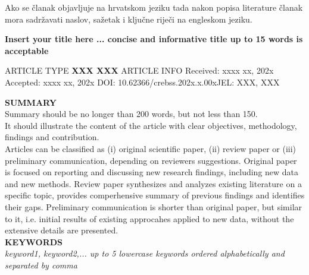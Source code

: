 \documentclass[
  letterpaper,
  DIV=11,
  numbers=noendperiod]{scrartcl}
\renewcommand\doinumber{10.62366/crebss.202x.x.00x}
\renewcommand\JEL{XXX, XXX}
\begin{document}
	\bigskip
	\bigskip
	
\noindent Ako se članak objavljuje na hrvatskom jeziku tada nakon popisa literature članak mora sadržavati naslov, sažetak i ključne riječi na engleskom jeziku.

\begin{center}
	\large  \bf Insert your title here ... {\color{red}concise and informative title up to 15 words is acceptable}
\end{center}

\begin{minipage}[b]{\dimexpr0.32\textwidth-1\fboxrule-0.5\fboxsep\relax}
	ARTICLE TYPE \newline
	\rm\small \textbf{XXX XXX} \newline \newline \newline
	ARTICLE INFO \newline
	Received: xxxx xx, 202x \newline Accepted: xxxx xx, 202x \newline DOI: \doinumber \newline JEL: \JEL  \newline \newline \newline
\end{minipage}%
\begin{minipage}[b]{0.68\textwidth}
	\vspace{0.2cm}  \textbf{SUMMARY} \\
		{\color{red} Summary should be no longer than 200 words, but not less than 150. \\ It should illustrate the content of the article with clear objectives, methodology, findings and contribution. \\ Articles can be classified as (i) original scientific paper, (ii) review paper or (iii) preliminary communication, depending on reviewers suggestions.} Original paper is focused on reporting and discussing new research findings, including new data and new methods. Review paper synthesizes and analyzes existing literature on a specific topic, provides comperhensive summary of previous findings and identifies their gaps. Preliminary communication is shorter than original paper, but similar to it, i.e. initial results of existing approcahes applied to new data, without the extensive details are presented. \smallskip \\
	\textbf{KEYWORDS} \\ {\it keyword1, keyword2,... {\color{red}up to 5 lowercase keywords ordered alphabetically and separated by comma}}
	
\end{minipage} 
	
\end{document}
